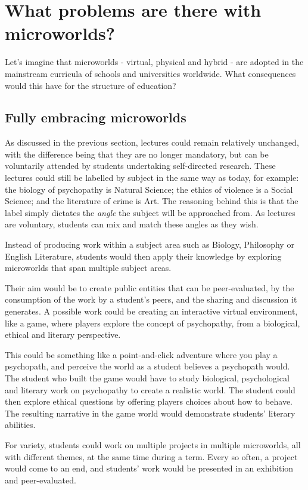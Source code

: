 \section{What problems are there with microworlds?}

Let's imagine that microworlds - virtual, physical and hybrid - are
adopted in the mainstream curricula of schools and universities
worldwide. What consequences would this have for the structure of
education?

\subsection{Fully embracing microworlds}

As discussed in the previous section, lectures could remain relatively
unchanged, with the difference being that they are no longer mandatory,
but can be voluntarily attended by students undertaking self-directed
research. These lectures could still be labelled by subject in the same
way as today, for example: the biology of psychopathy is Natural
Science; the ethics of violence is a Social Science; and the literature
of crime is Art. The reasoning behind this is that the label
simply dictates the \emph{angle} the subject will be approached from. As
lectures are voluntary, students can mix and match these angles as they
wish.

Instead of producing work within a subject area such as Biology,
Philosophy or English Literature, students would then apply their
knowledge by exploring microworlds that span multiple subject areas.

Their aim would be to create public entities that can be peer-evaluated, by the
consumption of the work by a student's peers, and the sharing and
discussion it generates. A possible work could be creating an
interactive virtual environment, like a game, where players explore the
concept of psychopathy, from a biological, ethical and literary
perspective.

This could be something like a point-and-click adventure where you play
a psychopath, and perceive the world as a student believes a psychopath
would. The student who built the game would have to study biological,
psychological and literary work on psychopathy to create a realistic
world. The student could then explore ethical questions by offering
players choices about how to behave. The resulting narrative in the game
world would demonstrate students' literary abilities.

For variety, students could work on multiple projects in multiple
microworlds, all with different themes, at the same time during a term.
Every so often, a project would come to an end, and students' work would
be presented in an exhibition and peer-evaluated.

